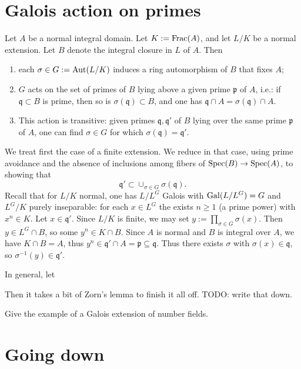 \documentclass[10pt]{article}
\begin{document}
\section{Galois action on primes}
\label{sec:org5aca683}

\begin{lemma}
  Let $A$ be a normal integral domain.  Let $K := \operatorname{Frac}(A)$, and
  let $L/K$ be a normal extension.  Let $B$ denote the integral
  closure in $L$ of $A$.  Then
  \begin{enumerate}
  \item each $\sigma \in G := \operatorname{Aut}(L/K)$ induces a ring
    automorphism of $B$ that fixes $A$;
  \item $G$ acts on the set of primes of $B$ lying above a given
    prime $\mathfrak{p}$ of $A$, i.e.: if
    $\mathfrak{q} \subset B$ is prime, then so is
    $\sigma(\mathfrak{q}) \subset B$, and one has
    $\mathfrak{q} \cap A = \sigma(\mathfrak{q}) \cap A$.
  \item This action is transitive: given primes
    $\mathfrak{q}, \mathfrak{q} '$ of $B$ lying over the same
    prime $\mathfrak{p}$ of $A$, one can find $\sigma \in G$ for
    which $\sigma(\mathfrak{q}) = \mathfrak{q} '$.
  \end{enumerate}
\end{lemma}
We treat first the case of a finite extension.
We reduce in that case, using prime avoidance and the absence of inclusions
among fibers of \(\operatorname{Spec}(B) \rightarrow \operatorname{Spec}(A)\),
to showing that
\[
    \mathfrak{q} ' \subset \cup_{\sigma \in
      G} \sigma(\mathfrak{q}).
  \]
Recall that for \(L/K\)
normal, one has \(L/L^G\) Galois with \(\operatorname{Gal}(L/L^G) = G\) and
\(L^G/K\) purely inseparable: for each \(x \in L^G\) the exists
\(n \geq 1\) (a prime power) with \(x^n \in K\).
Let \(x \in \mathfrak{q} '\).
Since \(L/K\) is finite,
we may set \(y := \prod_{\sigma \in G}
  \sigma(x)\).
Then \(y \in L^G \cap B\), so some \(y^n \in K \cap B\).
Since \(A\) is normal and \(B\) is integral over \(A\), we have \(K
  \cap B = A\),
thus \(y^n \in \mathfrak{q} ' \cap A = \mathfrak{p} \subseteq \mathfrak{q}\).
Thus there exists \(\sigma\) with \(\sigma(x) \in \mathfrak{q}\),
so \(\sigma^{-1}(y) \in \mathfrak{q} '\).

In general,
let 

Then it takes a bit of Zorn's lemma to finish it all off.
TODO: write that down.

Give the example of a Galois extension of number fields.


\section{Going down}
\label{sec:org4bb7b6b}
\end{document}
